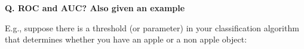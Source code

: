 \begin{frame}[fragile]{\textbf{Q. ROC and AUC? Also given an example}}
  \begin{wideitemize}
    \item E.g., suppose there is a threshold (or parameter) in your
      classification algorithm that determines whether you have an apple or a
      non apple object:\\
      \begin{flushleft}
      \end{flushleft}
  \end{wideitemize}
\end{frame}


